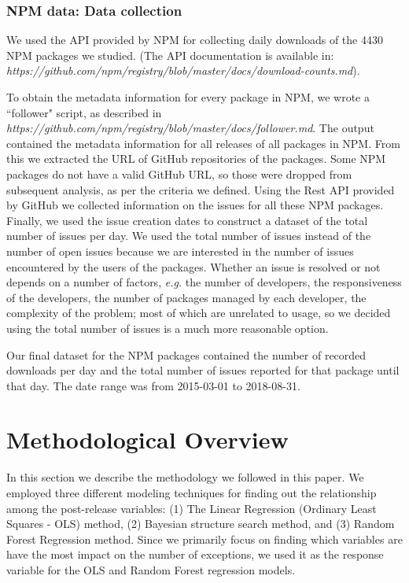 \documentclass[smallcondensed]{svjour3}     %
\begin{document}
\vspace{-10pt}
\subsubsection{NPM data: Data collection}

We used the API provided by NPM for collecting daily downloads of the 4430 NPM packages we studied. (The API documentation is available in:\\ \textit{https://github.com/npm/registry/blob/master/docs/download-counts.md}).

To obtain the metadata information for every package in NPM, we wrote a ``follower" script, as described in 
\\ \textit{https://github.com/npm/registry/blob/master/docs/follower.md}.
The output contained the metadata information for all releases of all packages in NPM. From this we extracted the URL of GitHub repositories of the packages. Some NPM packages do not have a valid GitHub URL, so those were dropped from subsequent analysis, as per the criteria we defined. Using the Rest API provided by GitHub we collected information on the issues for all these NPM packages. Finally, we used the issue creation dates to construct a dataset of the total number of issues per day. We used the total number of issues instead of the number of open issues because we are interested in the number of issues encountered by the users of the packages. Whether an issue is resolved or not depends on a number of factors, \emph{e.g.} the number of developers, the responsiveness of the developers, the number of packages managed by each developer, the complexity of the problem; most of which are unrelated to usage, so we decided using the total number of issues is a much more reasonable option.

Our final dataset for the NPM packages contained the number of recorded downloads per day and the total number of issues reported for that package until that day. The date range was from 2015-03-01 to 2018-08-31. 

\vspace{-10pt}
\section{Methodological Overview}\label{s:method}

In this section we describe the methodology we followed in this paper. We employed three different modeling techniques for finding out the relationship among the post-release variables: (1) The Linear Regression (Ordinary Least Squares - OLS) method, (2) Bayesian structure search method, and (3) Random Forest Regression method. Since we primarily focus on finding which variables are have the most impact on the number of exceptions, we used it as the response variable for the OLS and Random Forest regression models. 
\end{document}
